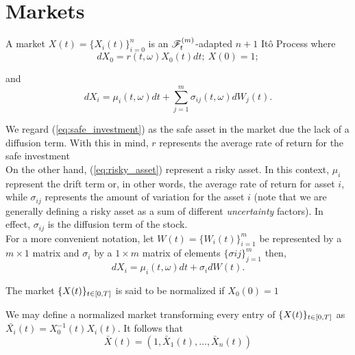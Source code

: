 \documentclass[../TGMAFFIRO.tex]{subfiles}
\begin{document}
\section{Markets}
\begin{definition}
	A market $X(t) = \{X_i(t)\}_{i=0}^n$ is an $\mathscr{F}^{(m)}_t$-adapted $n+1$ It\^o Process where
	\begin{equation}
		dX_0 = r(t,\omega) X_0(t) dt; \ X(0) = 1; \label{eq:safe_investment}
	\end{equation}
	
	and
	\begin{equation}
		dX_i = \mu_i(t,\omega) dt + \sum_{j=1}^{m}\sigma_{ij}(t,\omega)dW_j(t) \label{eq:risky_asset}.
	\end{equation}
\end{definition}

We regard (\ref{eq:safe_investment}) as the safe asset in the market due the lack of a diffusion term. With this in mind, $r$ represents the average rate of return for the safe investment\\

On the other hand, (\ref{eq:risky_asset}) represent a risky asset. In this context, $\mu_i$ represent the drift term or, in other words, the average rate of return for asset $i$, while $\sigma_{ij}$ represents the amount of variation for the asset $i$ (note that we are generally defining a risky asset as a sum of different \textit{uncertainty} factors). In effect, $\sigma_{ij}$ is the diffusion term of the stock.\\

For a more convenient notation, let $W(t) = \{W_i(t)\}_{i=1}^{m}$ be represented by a $m\times 1$ matrix and $\sigma_i$ by a $1\times m$ matrix of elements $\{\sigma{ij}\}_{j=1}^{m}$ then,
\begin{equation}
  dX_i = \mu_i(t,\omega) dt + \sigma_idW(t).
\end{equation}

\begin{definition}
	The market $\{X(t)\}_{t\in[0,T]}$ is said to be normalized if $X_0(0)= 1$
\end{definition}

We may define a normalized market transforming every entry of $\{X(t)\}_{t\in[0,T]}$ as $\bar{X_i}(t) = X_0^{-1}(t)X_i(t)$. It follows that
\begin{equation}
  \bar{X}(t) = (1, \bar{X}_1(t), \ldots, \bar{X}_n(t))
\end{equation}
\end{document}
